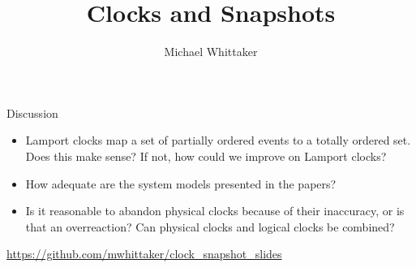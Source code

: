\documentclass{beamer}
\title{Clocks and Snapshots}
\author{Michael Whittaker}
\begin{document}
\begin{frame}
  \titlepage
\end{frame}




\begin{frame}{Discussion}
  \pause
  \begin{itemize}
    \item Lamport clocks map a set of partially ordered events to a totally
      ordered set. Does this make sense? If not, how could we improve on
      Lamport clocks?
    \item How adequate are the system models presented in the papers?
    \item Is it reasonable to abandon physical clocks because of their
      inaccuracy, or is that an overreaction? Can physical clocks and logical
      clocks be combined?
  \end{itemize}
\end{frame}

\begin{frame}
  \url{https://github.com/mwhittaker/clock\_snapshot\_slides}
\end{frame}
\end{document}

